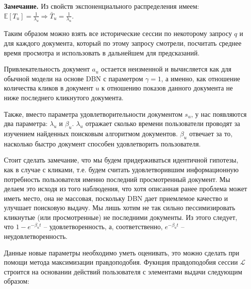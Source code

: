 \documentclass[diploma]{nanolab2015}
\begin{document}
\textbf{Замечание.} Из свойств экспоненциального распределения имеем: $\mathbb{E}[T_u] = \frac{1}{\lambda_u} \Rightarrow \bar{T}_u = \frac{1}{\lambda_u}$.

Таким образом можно взять все исторические сессии по некоторому запросу $q$ и для каждого документа, который по этому запросу смотрели, посчитать среднее время просмотра и использовать в дальнейшем для предсказаний.

Привлекательность документ $a_u$ остается неизменной и вычисляется как для обычной модели на основе DBN с параметром $\gamma = 1$, а именно, как отношение количества кликов в документ $u$ к отношению показов данного документа не ниже последнего кликнутого документа.

Также, вместо параметра удовлетворительности документом $s_u$, у нас появляются два параметра: $\lambda_u$ и $\beta_u$. $\lambda_u$ отражает сколько времени пользователи проводят за изучением найденных поисковым алгоритмом документов. $\beta_u$ отвечает за то, насколько быстро документ способен удовлетворить пользователя.

Стоит сделать замечание, что мы будем придерживаться идентичной гипотезы, как в случае с кликами, т.е. будем считать удовлетворившим информационную потребность пользователя именно последний просмотренный документ. Мы делаем это исходя из того наблюдения, что хотя описанная ранее проблема может иметь место, она не массовая, поскольку DBN дает приемлемое качество и улучшает поисковую выдачу. Мы лишь хотим не так сильно пессимизировать кликнутые (или просмотренные) не последними документы. Из этого следует, что $1 - e^{-\beta_u t}$ -- удовлетворенность, а, соответственно, $e^{-\beta_u t}$ -- неудовлетворенность.

Данные новые параметры необходимо уметь оценивать, это можно сделать при помощи метода максимизации правдоподобия. Фукнция правдоподобия сессии $\mathcal{L}$ строится на основании действий пользователя с элементами выдачи следующим образом:
\end{document}
